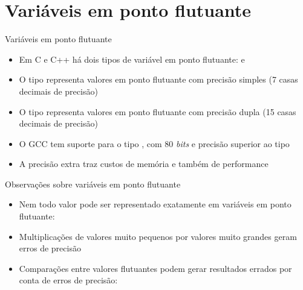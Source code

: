 \section{Variáveis em ponto flutuante}

\begin{frame}[fragile]{Variáveis em ponto flutuante}

    \begin{itemize}
        \item Em C e C++ há dois tipos de variável em ponto flutuante:  e

        \item O tipo  representa valores em ponto flutuante com precisão
            simples (7 casas decimais de precisão)

        \item O tipo  representa valores em ponto flutuante com precisão
            dupla (15 casas decimais de precisão)

        \item O GCC tem suporte para o tipo , com 80 \textit{bits} e 
            precisão superior ao tipo 

        \item A precisão extra traz custos de memória e também de performance

    \end{itemize}

\end{frame}

\begin{frame}[fragile]{Observações sobre variáveis em ponto flutuante}

    \begin{itemize}
        \item Nem todo valor pode ser representado exatamente em variáveis em ponto
            flutuante:

        \item Multiplicações de valores muito pequenos por valores muito grandes geram erros
            de precisão

        \item Comparações entre valores flutuantes podem gerar resultados errados por conta
            de erros de precisão:

    \end{itemize}

\end{frame}

